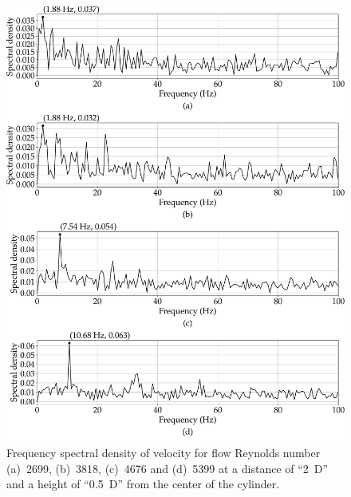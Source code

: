 \begin{figure}
    \centering
    \includegraphics[width=\linewidth]{gfx/FFT_all_freq_x_2D_y_0-5_D.pdf}
    \caption{Frequency spectral density of velocity for flow Reynolds number (a)~2699, (b)~3818, (c)~4676 and (d)~5399 at a distance of \enquote{2~D} and a height of \enquote{0.5~D} from the center of the cylinder.}
    \label{fig:surface_x_2D_y_0-5_D}
\end{figure}

